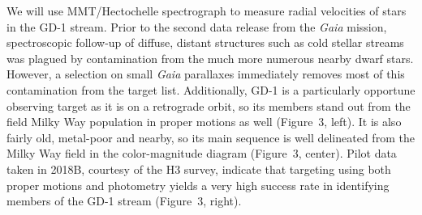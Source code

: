 \documentclass[12pt]{article}
\begin{document}
We will use MMT/Hectochelle spectrograph to measure radial velocities of stars in the GD-1 stream.
Prior to the second data release from the \emph{Gaia} mission, spectroscopic follow-up of diffuse, distant structures such as cold stellar streams was plagued by contamination from the much more numerous nearby dwarf stars.
However, a selection on small \emph{Gaia} parallaxes immediately removes most of this contamination from the target list.
Additionally, GD-1 is a particularly opportune observing target as it is on a retrograde orbit, so its members stand out from the field Milky Way population in proper motions as well (Figure~3, left).
It is also fairly old, metal-poor and nearby, so its main sequence is well delineated from the Milky Way field in the color-magnitude diagram (Figure~3, center).
Pilot data taken in 2018B, courtesy of the H3 survey, indicate that targeting using both proper motions and photometry yields a very high success rate in identifying members of the GD-1 stream (Figure~3, right). 
\end{document}
